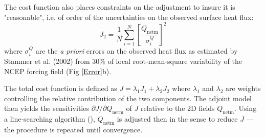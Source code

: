 The cost function also places constraints on the adjustment to insure it is
"reasonable", i.e. of order of the uncertainties on the observed surface heat
flux: 
\begin{equation}
J_2 = \frac{1}{N} \sum_{i=1}^N \left[\frac{Q_\mathrm{netm}}{\sigma^Q_i} \right]^2
\end{equation}
where $\sigma^Q_i$ are the {\it a priori} errors on the observed heat flux as
estimated by Stammer et al. (2002) from 30\% of local root-mean-square
variability of the NCEP forcing field (Fig \ref{Error}b).

The total cost function is defined as $J=\lambda_1 J_1+ \lambda_2 J_2$ where
$\lambda_1$ and $\lambda_2$ are weights controlling the relative contribution
of the two components. The adjoint model then yields the sensitivities
$\partial J/\partial Q_\mathrm{netm}$ of $J$ relative to the 2D fields
$Q_\mathrm{netm}$. Using a line-searching algorithm (\cite{gil-lem:89}),
$Q_\mathrm{netm}$ is adjusted then in the sense to
reduce $J$ --- the procedure is repeated until convergence.


